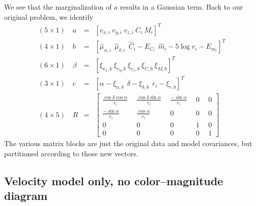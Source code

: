 \documentclass{article}
\newcommand{\eqn}[1]{\begin{eqnarray}#1\end{eqnarray}}
\begin{document}
We see that the marginalization of $a$ results in a Gaussian term. Back to our original problem, we identify
\eqn{
	(5\times1)\quad  a &=& [v_{x,i} \ v_{y,i} \ v_{z,i} \ C_i \ M_i]^T \\
	(4\times1)\quad b &=&  [\hat{\mu}_{\alpha, i}\ \ \hat{\mu}_{\delta, i}\  \ \hat{C}_i - E_{C_i} \ \  \hat{m}_i - 5\log r_i -E_{m_i}]^T\\
	(6\times1)\quad \beta &=& [\xi_{v_x, b} \ \xi_{v_y, b} \ \xi_{v_z, b} \ \xi_{C, b}\ \xi_{M, b}]^T \\
	(3\times1)\quad c &=& [\alpha-\xi_{\alpha, b} \  \ \delta-\xi_{\delta, b} \ \ r_i-\xi_{r, b}]^T\\
	(4\times5)\quad R &=& \begin{bmatrix} 
		\frac{\cos\delta\cos\alpha}{r_i}	\ &\ 	\frac{\cos\delta\sin\alpha}{r_i}	\ &\ 	\frac{-\sin\alpha}{r_i}	\ &\ 0	\ &\  0\\
		\frac{-\sin\alpha}{r_i}	\ &\ 	\frac{\cos\alpha}{r_i}	\ &\ 	0	\ &\ 0	\ &\  0\\
		0 \ &\  0 \ &\ 0 \ &\ 1\ &\  0\\
		0\ &\  0\ &\  0 \ &\ 0\ &\  1
	\end{bmatrix} 
}
The various matrix blocks are just the original data and model covariances, but partitioned according to those new vectors.




\newpage
\subsection{Velocity model only, no color--magnitude diagram}
\end{document}

